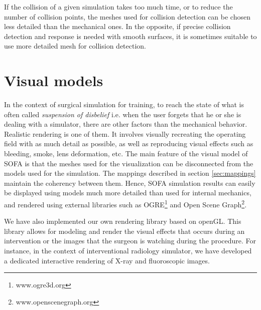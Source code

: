 If the collision of a given simulation takes too much time, or to reduce the number of collision points, the meshes used for collision detection can be chosen less detailed than the mechanical ones. 
In the opposite, if precise collision detection and response is needed with  smooth surfaces, it is sometimes suitable to use more detailed mesh for collision detection.











\section{Visual models} \label{sec:visual}

In the context of surgical simulation for training, to reach the state of what is often called \textit{suspension of disbelief} i.e. when the user forgets that he or she is dealing with a simulator, there are other factors than the mechanical behavior. 
Realistic rendering is one of them. 
It involves visually recreating the operating field with as much detail as possible, as well as reproducing visual effects such as bleeding, smoke, lens deformation, etc.
The main feature of the visual model of SOFA is that the meshes used for the visualization can be disconnected from the models used for the simulation. 
The mappings described in section \ref{sec:mappings} maintain the coherency between them.
Hence, SOFA simulation results can easily be displayed using models much more detailed than used for internal mechanics, and rendered using external libraries such as OGRE\footnote{www.ogre3d.org} and Open Scene Graph\footnote{www.openscenegraph.org}.

We have also implemented our own rendering library based on openGL. 
This library allows for modeling and render the visual effects that occurs during an intervention or the images that the surgeon is watching during the procedure.
For instance, in the context of interventional radiology simulator, we have developed  a dedicated interactive rendering of X-ray and fluoroscopic images. 




